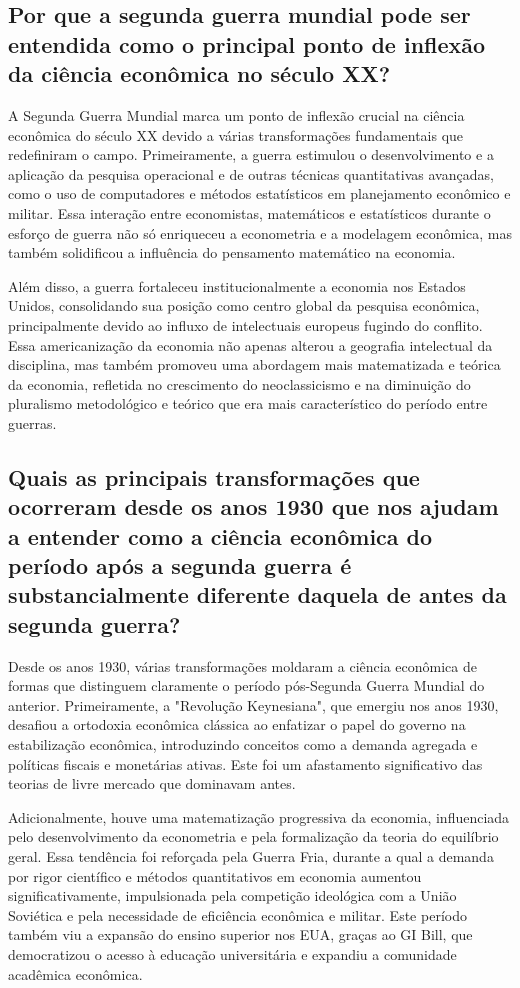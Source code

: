 \documentclass[a4paper,12pt]{article}[abntex2]
\begin{document}
\subsection{\textbf{Por que a segunda guerra mundial pode ser entendida como o principal ponto de inflexão da ciência econômica no século XX?}}
A Segunda Guerra Mundial marca um ponto de inflexão crucial na ciência econômica do século XX devido a várias transformações fundamentais que redefiniram o campo. Primeiramente, a guerra estimulou o desenvolvimento e a aplicação da pesquisa operacional e de outras técnicas quantitativas avançadas, como o uso de computadores e métodos estatísticos em planejamento econômico e militar. Essa interação entre economistas, matemáticos e estatísticos durante o esforço de guerra não só enriqueceu a econometria e a modelagem econômica, mas também solidificou a influência do pensamento matemático na economia.

Além disso, a guerra fortaleceu institucionalmente a economia nos Estados Unidos, consolidando sua posição como centro global da pesquisa econômica, principalmente devido ao influxo de intelectuais europeus fugindo do conflito. Essa americanização da economia não apenas alterou a geografia intelectual da disciplina, mas também promoveu uma abordagem mais matematizada e teórica da economia, refletida no crescimento do neoclassicismo e na diminuição do pluralismo metodológico e teórico que era mais característico do período entre guerras.


\subsection{\textbf{Quais as principais transformações que ocorreram desde os anos 1930 que nos ajudam a entender como a ciência econômica do período após a segunda guerra é substancialmente diferente daquela de antes da segunda guerra?}}
Desde os anos 1930, várias transformações moldaram a ciência econômica de formas que distinguem claramente o período pós-Segunda Guerra Mundial do anterior. Primeiramente, a "Revolução Keynesiana", que emergiu nos anos 1930, desafiou a ortodoxia econômica clássica ao enfatizar o papel do governo na estabilização econômica, introduzindo conceitos como a demanda agregada e políticas fiscais e monetárias ativas. Este foi um afastamento significativo das teorias de livre mercado que dominavam antes.

Adicionalmente, houve uma matematização progressiva da economia, influenciada pelo desenvolvimento da econometria e pela formalização da teoria do equilíbrio geral. Essa tendência foi reforçada pela Guerra Fria, durante a qual a demanda por rigor científico e métodos quantitativos em economia aumentou significativamente, impulsionada pela competição ideológica com a União Soviética e pela necessidade de eficiência econômica e militar. Este período também viu a expansão do ensino superior nos EUA, graças ao GI Bill, que democratizou o acesso à educação universitária e expandiu a comunidade acadêmica econômica.
\end{document}
